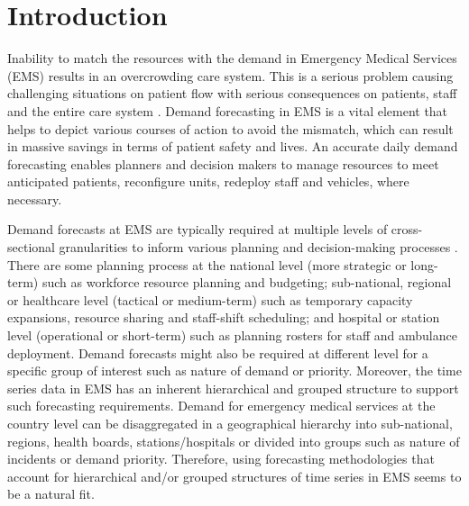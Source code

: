 \documentclass[
  authoryear,
  preprint,
  3p]{elsarticle}
\begin{document}
\hypertarget{sec-intro}{%
\section{Introduction}\label{sec-intro}}

Inability to match the resources with the demand in Emergency Medical
Services (EMS) results in an overcrowding care system. This is a serious
problem causing challenging situations on patient flow with serious
consequences on patients, staff and the entire care system
\citep{ekstrom2015forecasting, ROSTAMITABAR20221197}. Demand forecasting
in EMS is a vital element that helps to depict various courses of action
to avoid the mismatch, which can result in massive savings in terms of
patient safety and lives. An accurate daily demand forecasting enables
planners and decision makers to manage resources to meet anticipated
patients, reconfigure units, redeploy staff and vehicles, where
necessary.

Demand forecasts at EMS are typically required at multiple levels of
cross-sectional granularities to inform various planning and
decision-making processes \citep{hulshof2012taxonomic}. There are some
planning process at the national level (more strategic or long-term)
such as workforce resource planning and budgeting; sub-national,
regional or healthcare level (tactical or medium-term) such as temporary
capacity expansions, resource sharing and staff-shift scheduling; and
hospital or station level (operational or short-term) such as planning
rosters for staff and ambulance deployment. Demand forecasts might also
be required at different level for a specific group of interest such as
nature of demand or priority. Moreover, the time series data in EMS has
an inherent hierarchical and grouped structure to support such
forecasting requirements. Demand for emergency medical services at the
country level can be disaggregated in a geographical hierarchy into
sub-national, regions, health boards, stations/hospitals or divided into
groups such as nature of incidents or demand priority. Therefore, using
forecasting methodologies that account for hierarchical and/or grouped
structures of time series in EMS seems to be a natural fit.
\end{document}
